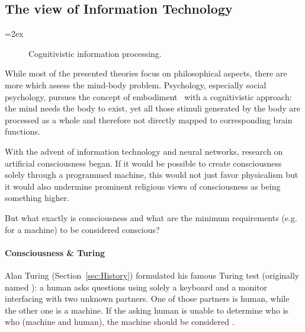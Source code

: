 

\subsection{The view of Information Technology}

{\columnsep=2ex\begin{wrapfigure}[11]{r}{.45\linewidth}
\vspace*{-.9\baselineskip}
\caption{Cognitivistic information processing.}
\end{wrapfigure}
While most of the presented theories focus on philosophical aspects, there are more which assess the mind-body problem.
Psychology, especially social psychology, pursues the concept of embodiment~\cite{meier2012embodiment} with a cognitivistic approach:
the mind needs the body to exist, yet all those stimuli generated by the body are processed as a whole and therefore not directly mapped to corresponding brain functions.\par}

With the advent of information technology and neural networks, research on artificial consciousness began. If it would be possible to create consciousness solely through a programmed machine, this would not just favor physicalism but it would also undermine prominent religious views of consciousness as being something higher.

But what exactly is consciousness and what are the minimum requirements (e.g. for a machine) to be considered conscious?

\paragraph{Consciousness \& Turing} Alan Turing (Section~\ref{sec:History}) formulated his famous Turing test (originally named ): a human asks questions using solely a keyboard and a monitor interfacing with two unknown partners. One of those partners is human, while the other one is a machine. If the asking human is unable to determine who is who (machine and human), the machine should be considered .

